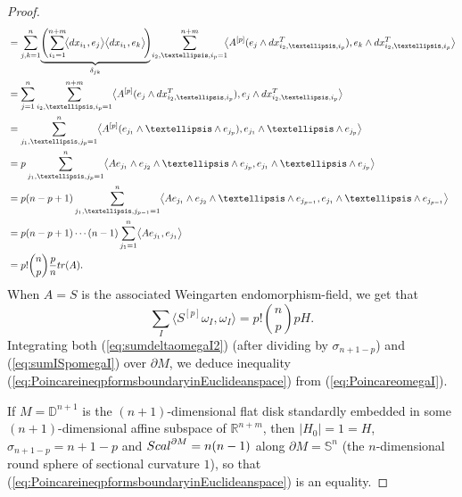 \documentclass[11pt]{article}
\numberwithin{equation}{section}
\numberwithin{equation}{section}
\begin{document}
\begin{proof}
\begin{align}
&= \sum_{j,k=1}^n\!\underbrace{\left(\sum_{i_1=1}^{n+m}\!\bigl\langle {\rm d}x_{i_1},{\rm e}_j\bigr\rangle\bigl\langle {\rm d}x_{i_1},{\rm e}_k\bigr\rangle\!\right)\!}_{\delta_{jk}}\sum_{i_2,\dots,i_p=1}^{n+m}\!\!\bigl\langle A^{[p]}({\rm e}_j\wedge {\rm d}x_{i_2,\dots,i_p}^T),{\rm e}_k\wedge {\rm d}x_{i_2,\dots,i_p}^T\bigr\rangle\nonumber\\
&= \sum_{j=1}^n\sum_{i_2,\dots,i_p=1}^{n+m}\bigl\langle A^{[p]}({\rm e}_j\wedge {\rm d}x_{i_2,\dots,i_p}^T),{\rm e}_j\wedge {\rm d}x_{i_2,\dots,i_p}^T\bigr\rangle\nonumber\\
&= \sum_{j_1,\dots,j_p=1}^n\bigl\langle A^{[p]}({\rm e}_{j_1}\wedge\dots\wedge {\rm e}_{j_p}),{\rm e}_{j_1}\wedge\dots\wedge {\rm e}_{j_p}\bigr\rangle\nonumber\\
&= p\sum_{j_1,\dots,j_p=1}^n\bigl\langle A{\rm e}_{j_1}\wedge {\rm e}_{j_2}\wedge\dots\wedge {\rm e}_{j_p},{\rm e}_{j_1}\wedge\dots\wedge {\rm e}_{j_p}\bigr\rangle\nonumber\\
&= p(n-p+1)\sum_{j_1,\dots,j_{p-1}=1}^n\bigl\langle A{\rm e}_{j_1}\wedge {\rm e}_{j_2}\wedge\dots\wedge {\rm e}_{j_{p-1}},{\rm e}_{j_1}\wedge\dots\wedge {\rm e}_{j_{p-1}}\bigr\rangle\nonumber\\
&= p(n-p+1)\cdots(n-1)\sum_{j_1=1}^n\bigl\langle A{\rm e}_{j_1},{\rm e}_{j_1}\bigr\rangle\nonumber\\
&= p!\binom{n}{p}\frac{p}{n}{\rm tr}(A).\label{eq:traceap}
\end{align}
When $A=S$ is the associated Weingarten endomorphism-field, we get that
\begin{equation}\label{eq:sumISpomegaI}
\sum_I\bigl\langle S^{[p]}\omega_I,\omega_I\bigr\rangle=p!\binom{n}{p}pH.
\end{equation}
Integrating both (\ref{eq:sumdeltaomegaI2}) (after dividing by $\sigma_{n+1-p}$) and (\ref{eq:sumISpomegaI}) over $\partial M$, we deduce i\-ne\-qua\-li\-ty (\ref{eq:PoincareineqpformsboundaryinEuclideanspace}) from (\ref{eq:PoincareomegaI}).

If $M=\mathbb{D}^{n+1}$ is the $(n+1)$-dimensional flat disk standardly embedded in some $(n+1)$-dimensional affine subspace of $\mathbb{R}^{n+m}$, then $|H_0|=1=H$, $\sigma_{n+1-p}=n+1-p$ and  ${\rm Scal}^{\partial M}=n(n-1)$  along $\partial M=\mathbb{S}^n$ (the $n$-dimensional round sphere of sectional curvature $1$), so that (\ref{eq:PoincareineqpformsboundaryinEuclideanspace})  is an equality.


\end{proof}
\end{document}
